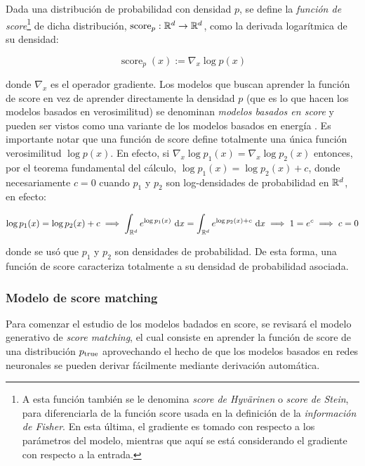 Dada una distribución de probabilidad con densidad $p$, se define la \textit{función de score}\footnote{A esta función también se le denomina \textit{score de Hyvärinen} o \textit{score de Stein}, para diferenciarla de la función score usada en la definición de la \textit{información de Fisher}. En esta última, el gradiente es tomado con respecto a los parámetros del modelo, mientras que aquí se está considerando el gradiente con respecto a la entrada.} de dicha distribución, $\operatorname{score}_p:\mathbb{R}^d\to\mathbb{R}^d$, como la derivada logarítmica de su densidad:

\begin{equation*}
    \operatorname{score}_p(x) := \nabla_x \log p(x)
\end{equation*}

donde $\nabla_x$ es el operador gradiente. Los modelos que buscan aprender la función de score en vez de aprender directamente la densidad $p$ (que es lo que hacen los modelos basados en verosimilitud) se denominan \textit{modelos basados en score} y pueden ser vistos como una variante de los modelos basados en energía \cite{song2021trainenergybasedmodels}. Es importante notar que una función de score define totalmente una única función verosimilitud $\log p(x)$. En efecto, si $\nabla_x \log p_1(x) = \nabla_x \log p_2(x)$ entonces, por el teorema fundamental del cálculo, $\log p_1(x) = \log p_2(x)+c$, donde necesariamente $c=0$ cuando $p_1$ y $p_2$ son log-densidades de probabilidad en $\mathbb{R}^d$, en efecto:

\begin{equation*}
    \log p_1(x) = \log p_2(x)+c \implies \int_{\mathbb{R}^d} e^{\log p_1(x)} \,\operatorname{d}\! x = \int_{\mathbb{R}^d} e^{\log p_2(x)+c}\,\operatorname{d}\! x \implies 1 = e^c \implies c = 0
\end{equation*}

donde se usó que $p_1$ y $p_2$ son densidades de probabilidad. De esta forma, una función de score caracteriza totalmente a su densidad de probabilidad asociada.

\subsubsection{Modelo de score matching}

Para comenzar el estudio de los modelos badados en score, se revisará el modelo generativo de \textit{score matching}, el cual consiste en aprender la función de score de una distribución $p_{\operatorname{true}}$ aprovechando el hecho de que los modelos basados en redes neuronales se pueden derivar fácilmente mediante derivación automática.

